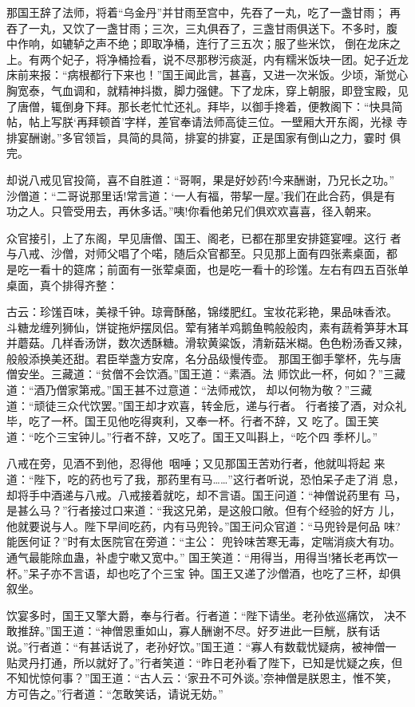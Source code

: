 那国王辞了法师，将着“乌金丹”并甘雨至宫中，先吞了一丸，吃了一盏甘雨；
再吞了一丸，又饮了一盏甘雨；三次，三丸俱吞了，三盏甘雨俱送下。不多时，腹
中作响，如辘轳之声不绝；即取净桶，连行了三五次；服了些米饮，倒在龙床之
上。有两个妃子，将净桶捡看，说不尽那秽污痰涎，内有糯米饭块一团。妃子近龙
床前来报：“病根都行下来也！”国王闻此言，甚喜，又进一次米饭。少顷，渐觉心
胸宽泰，气血调和，就精神抖擞，脚力强健。下了龙床，穿上朝服，即登宝殿，见
了唐僧，辄倒身下拜。那长老忙忙还礼。拜毕，以御手搀着，便教阁下：“快具简
帖，帖上写朕‘再拜顿首’字样，差官奉请法师高徒三位。一壁厢大开东阁，光禄
寺排宴酬谢。”多官领旨，具简的具简，排宴的排宴，正是国家有倒山之力，霎时
俱完。

却说八戒见官投简，喜不自胜道：“哥啊，果是好妙药!今来酬谢，乃兄长之功。”
沙僧道：“二哥说那里话!常言道：‘一人有福，带挈一屋。’我们在此合药，俱是有
功之人。只管受用去，再休多话。”咦!你看他弟兄们俱欢欢喜喜，径入朝来。

众官接引，上了东阁，早见唐僧、国王、阁老，已都在那里安排筵宴哩。这行
者与八戒、沙僧，对师父唱了个喏，随后众官都至。只见那上面有四张素桌面，都
是吃一看十的筵席；前面有一张荤桌面，也是吃一看十的珍馐。左右有四五百张单
桌面，真个排得齐整：

古云：珍馐百味，美禄千钟。琼膏酥酪，锦缕肥红。宝妆花彩艳，果品味香浓。
斗糖龙缠列狮仙，饼锭拖炉摆凤侣。荤有猪羊鸡鹅鱼鸭般般肉，素有蔬肴笋芽木耳
并蘑菇。几样香汤饼，数次透酥糖。滑软黄粱饭，清新菇米糊。色色粉汤香又辣，
般般添换美还甜。君臣举盏方安席，名分品级慢传壶。
那国王御手擎杯，先与唐僧安坐。三藏道：“贫僧不会饮酒。”国王道：“素酒。法
师饮此一杯，何如？”三藏道：“酒乃僧家第戒。”国王甚不过意道：“法师戒饮，
却以何物为敬？”三藏道：“顽徒三众代饮罢。”国王却才欢喜，转金卮，递与行者。
行者接了酒，对众礼毕，吃了一杯。国王见他吃得爽利，又奉一杯。行者不辞，又
吃了。国王笑道：“吃个三宝钟儿。”行者不辞，又吃了。国王又叫斟上，“吃个四
季杯儿。”

八戒在旁，见酒不到他，忍得他咽唾；又见那国王苦劝行者，他就叫将起
来道：“陛下，吃的药也亏了我，那药里有马……”这行者听说，恐怕呆子走了消
息，却将手中酒递与八戒。八戒接着就吃，却不言语。国王问道：“神僧说药里有
马，是甚么马？”行者接过口来道：“我这兄弟，是这般口敞。但有个经验的好方
儿，他就要说与人。陛下早间吃药，内有马兜铃。”国王问众官道：“马兜铃是何品
味?能医何证？”时有太医院官在旁道：“主公：
兜铃味苦寒无毒，定喘消痰大有功。
通气最能除血蛊，补虚宁嗽又宽中。”
国王笑道：“用得当，用得当!猪长老再饮一杯。”呆子亦不言语，却也吃了个三宝
钟。国王又递了沙僧酒，也吃了三杯，却俱叙坐。

饮宴多时，国王又擎大爵，奉与行者。行者道：“陛下请坐。老孙依巡痛饮，
决不敢推辞。”国王道：“神僧恩重如山，寡人酬谢不尽。好歹进此一巨觥，朕有话
说。”行者道：“有甚话说了，老孙好饮。”国王道：“寡人有数载忧疑病，被神僧一
贴灵丹打通，所以就好了。”行者笑道：“昨日老孙看了陛下，已知是忧疑之疾，但
不知忧惊何事？”国王道：“古人云：‘家丑不可外谈。’奈神僧是朕恩主，惟不笑，
方可告之。”行者道：“怎敢笑话，请说无妨。”

